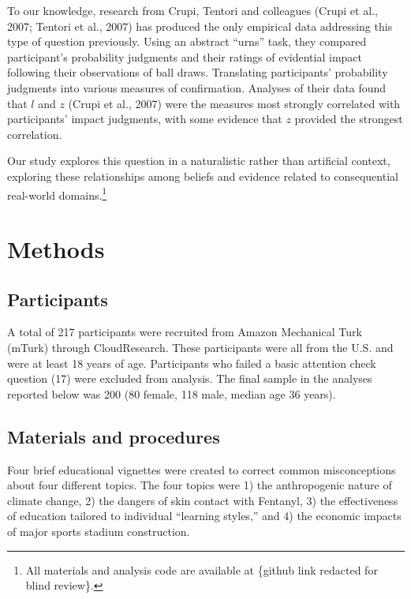 \documentclass[10pt, letterpaper]{article}
\begin{document}
To our knowledge, research from Crupi, Tentori and colleagues (Crupi et
al., 2007; Tentori et al., 2007) has produced the only empirical data
addressing this type of question previously. Using an abstract ``urns''
task, they compared participant's probability judgments and their
ratings of evidential impact following their observations of ball draws.
Translating participants' probability judgments into various measures of
confirmation. Analyses of their data found that \(l\) and \(z\) (Crupi
et al., 2007) were the measures most strongly correlated with
participants' impact judgments, with some evidence that \(z\) provided
the strongest correlation.

Our study explores this question in a naturalistic rather than
artificial context, exploring these relationships among beliefs and
evidence related to consequential real-world domains.\footnote{All
  materials and analysis code are available at \{github link redacted
  for blind review\}.}

\hypertarget{methods}{%
\section{Methods}\label{methods}}

\hypertarget{participants}{%
\subsection{Participants}\label{participants}}

A total of 217 participants were recruited from Amazon Mechanical Turk
(mTurk) through CloudResearch. These participants were all from the U.S.
and were at least 18 years of age. Participants who failed a basic
attention check question (17) were excluded from analysis. The final
sample in the analyses reported below was 200 (80 female, 118 male,
median age 36 years).

\hypertarget{materials-and-procedures}{%
\subsection{Materials and procedures}\label{materials-and-procedures}}

Four brief educational vignettes were created to correct common
misconceptions about four different topics. The four topics were 1) the
anthropogenic nature of climate change, 2) the dangers of skin contact
with Fentanyl, 3) the effectiveness of education tailored to individual
``learning styles,'' and 4) the economic impacts of major sports stadium
construction.
\end{document}

